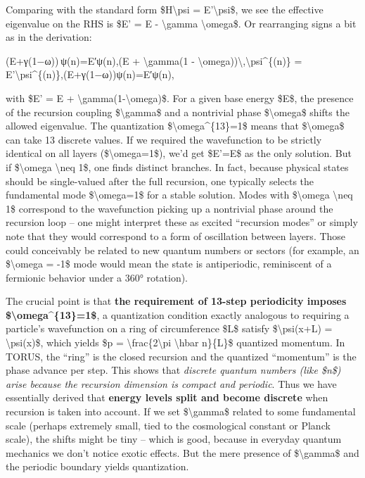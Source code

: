 \documentclass[]{article}
\begin{document}
Comparing with the standard form \$H\textbackslash{}psi =
E'\textbackslash{}psi\$, we see the effective eigenvalue on the RHS is
\$E' = E - \textbackslash{}gamma \textbackslash{}omega\$. Or rearranging
signs a bit as in the derivation:

(E+γ(1−ω)) ψ(n)=E′ψ(n),(E + \textbackslash{}gamma(1 -
\textbackslash{}omega))\textbackslash{},\textbackslash{}psi\^{}\{(n)\} =
E'\textbackslash{}psi\^{}\{(n)\},(E+γ(1−ω))ψ(n)=E′ψ(n),

with \$E' = E + \textbackslash{}gamma(1-\textbackslash{}omega)\$​. For a
given base energy \$E\$, the presence of the recursion coupling
\$\textbackslash{}gamma\$ and a nontrivial phase
\$\textbackslash{}omega\$ shifts the allowed eigenvalue. The
quantization \$\textbackslash{}omega\^{}\{13\}=1\$ means that
\$\textbackslash{}omega\$ can take 13 discrete values. If we required
the wavefunction to be strictly identical on all layers
(\$\textbackslash{}omega=1\$), we'd get \$E'=E\$ as the only solution.
But if \$\textbackslash{}omega \textbackslash{}neq 1\$, one finds
distinct branches. In fact, because physical states should be
single-valued after the full recursion, one typically selects the
fundamental mode \$\textbackslash{}omega=1\$ for a stable solution​.
Modes with \$\textbackslash{}omega \textbackslash{}neq 1\$ correspond to
the wavefunction picking up a nontrivial phase around the recursion loop
-- one might interpret these as excited ``recursion modes'' or simply
note that they would correspond to a form of oscillation between
layers​. Those could conceivably be related to new quantum numbers or
sectors (for example, an \$\textbackslash{}omega = -1\$ mode would mean
the state is antiperiodic, reminiscent of a fermionic behavior under a
360° rotation).

The crucial point is that \textbf{the requirement of 13-step periodicity
imposes \$\textbackslash{}omega\^{}\{13\}=1\$}, a quantization condition
exactly analogous to requiring a particle's wavefunction on a ring of
circumference \$L\$ satisfy \$\textbackslash{}psi(x+L) =
\textbackslash{}psi(x)\$, which yields \$p =
\textbackslash{}frac\{2\textbackslash{}pi \textbackslash{}hbar
n\}\{L\}\$ quantized momentum​. In TORUS, the ``ring'' is the closed
recursion and the quantized ``momentum'' is the phase advance per step.
This shows that \emph{discrete quantum numbers (like \$n\$) arise
because the recursion dimension is compact and periodic}. Thus we have
essentially derived that \textbf{energy levels split and become
discrete} when recursion is taken into account​. If we set
\$\textbackslash{}gamma\$ related to some fundamental scale (perhaps
extremely small, tied to the cosmological constant or Planck scale), the
shifts might be tiny -- which is good, because in everyday quantum
mechanics we don't notice exotic effects. But the mere presence of
\$\textbackslash{}gamma\$ and the periodic boundary yields quantization.
\end{document}

